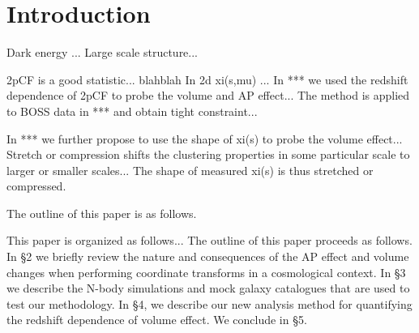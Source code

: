 \documentclass[iop]{emulateapj}
\begin{document}



\section{Introduction}


 

Dark energy ... Large scale structure...

 

2pCF is a good statistic... blahblah
In 2d xi(s,mu) ...
In *** we used the redshift dependence of 2pCF to probe the volume and AP effect...
The method is applied to BOSS data in *** and obtain tight constraint...

 

In *** we further propose to use the shape of xi(s) to probe the volume effect...
Stretch or compression shifts the clustering properties in some particular scale to larger or smaller scales...
The shape of measured xi(s) is thus stretched or compressed.

The outline of this paper is as follows. 

This paper is organized as follows...
The outline of this paper proceeds as follows. 
In \S 2 we briefly review the nature and consequences of the AP effect and volume changes when performing coordinate transforms in a cosmological context. 
In \S 3 we describe the N-body simulations and mock galaxy catalogues that are used to test our methodology.
In \S 4, we describe our new analysis method for quantifying the redshift dependence of volume effect.
We conclude in \S 5.
\end{document}
